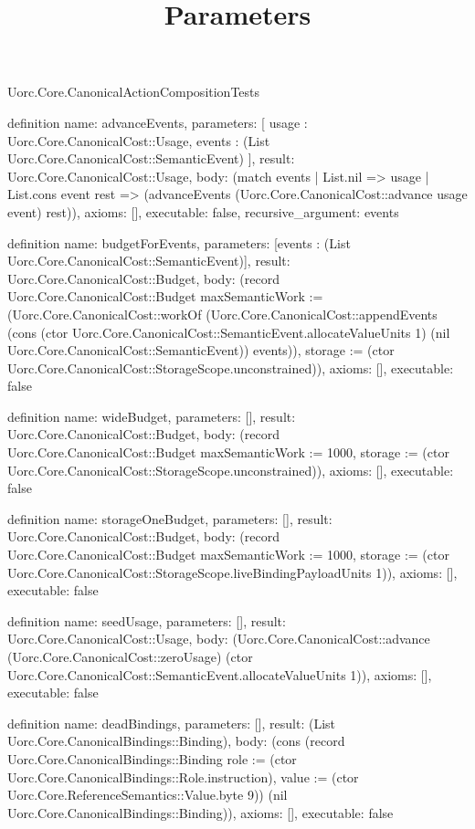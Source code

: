 \begin{lexlean}{Uorc.Core.CanonicalActionCompositionTests}
\title{Parameters}
\begin{semanticmodule}
definition{
  name: advanceEvents,
  parameters: [
    usage : Uorc.Core.CanonicalCost::Usage,
    events : (List Uorc.Core.CanonicalCost::SemanticEvent)
  ],
  result: Uorc.Core.CanonicalCost::Usage,
  body: (match events
    | List.nil => usage
    | List.cons event rest => (advanceEvents (Uorc.Core.CanonicalCost::advance usage event) rest)),
  axioms: [],
  executable: false,
  recursive_argument: events
}

definition{
  name: budgetForEvents,
  parameters: [events : (List Uorc.Core.CanonicalCost::SemanticEvent)],
  result: Uorc.Core.CanonicalCost::Budget,
  body: (record Uorc.Core.CanonicalCost::Budget {maxSemanticWork := (Uorc.Core.CanonicalCost::workOf (Uorc.Core.CanonicalCost::appendEvents (cons (ctor Uorc.Core.CanonicalCost::SemanticEvent.allocateValueUnits 1) (nil Uorc.Core.CanonicalCost::SemanticEvent)) events)), storage := (ctor Uorc.Core.CanonicalCost::StorageScope.unconstrained)}),
  axioms: [],
  executable: false
}

definition{
  name: wideBudget,
  parameters: [],
  result: Uorc.Core.CanonicalCost::Budget,
  body: (record Uorc.Core.CanonicalCost::Budget {maxSemanticWork := 1000, storage := (ctor Uorc.Core.CanonicalCost::StorageScope.unconstrained)}),
  axioms: [],
  executable: false
}

definition{
  name: storageOneBudget,
  parameters: [],
  result: Uorc.Core.CanonicalCost::Budget,
  body: (record Uorc.Core.CanonicalCost::Budget {maxSemanticWork := 1000, storage := (ctor Uorc.Core.CanonicalCost::StorageScope.liveBindingPayloadUnits 1)}),
  axioms: [],
  executable: false
}

definition{
  name: seedUsage,
  parameters: [],
  result: Uorc.Core.CanonicalCost::Usage,
  body: (Uorc.Core.CanonicalCost::advance (Uorc.Core.CanonicalCost::zeroUsage) (ctor Uorc.Core.CanonicalCost::SemanticEvent.allocateValueUnits 1)),
  axioms: [],
  executable: false
}

definition{
  name: deadBindings,
  parameters: [],
  result: (List Uorc.Core.CanonicalBindings::Binding),
  body: (cons (record Uorc.Core.CanonicalBindings::Binding {role := (ctor Uorc.Core.CanonicalBindings::Role.instruction), value := (ctor Uorc.Core.ReferenceSemantics::Value.byte 9)}) (nil Uorc.Core.CanonicalBindings::Binding)),
  axioms: [],
  executable: false
}


\end{semanticmodule}
\end{lexlean}
